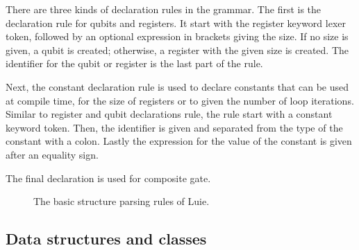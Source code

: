 There are three kinds of declaration rules in the grammar. The first is the declaration rule for qubits and registers. It start with the register keyword lexer token, followed by an optional expression in brackets giving the size. If no size is given, a qubit is created; otherwise, a register with the given size is created. The identifier for the qubit or register is the last part of the rule. 

Next, the constant declaration rule is used to declare constants that can be used at compile time, \eg for the size of registers or to given the number of loop iterations. Similar to register and qubit declarations rule, the rule start with a constant keyword token. Then, the identifier is given and separated from the type of the constant with a colon. Lastly the expression for the value of the constant is given after an equality sign.

The final declaration is used for composite gate. 
\begin{figure}[htp]
    \centering
    
    \caption{The basic structure parsing rules of Luie.}
    \label{fig:implementation_grammarDeclarations}
\end{figure}

\subsection{Data structures and classes}
